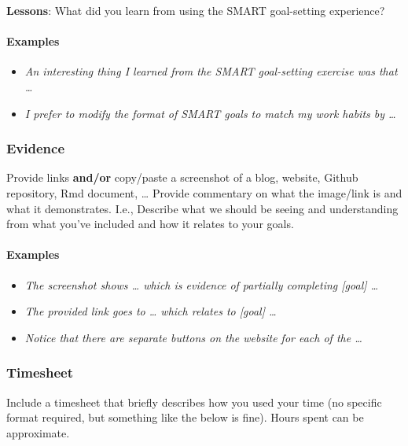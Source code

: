 \documentclass[
  openany]{book}
\providecommand{\tightlist}{%
  \setlength{\itemsep}{0pt}\setlength{\parskip}{0pt}}
\begin{document}
\textbf{Lessons}: What did you learn from using the SMART goal-setting experience?

\hypertarget{examples-3}{%
\paragraph{Examples}\label{examples-3}}

\begin{itemize}
\tightlist
\item
  \emph{An interesting thing I learned from the SMART goal-setting exercise was that \ldots{}}\\
\item
  \emph{I prefer to modify the format of SMART goals to match my work habits by \ldots{}}
\end{itemize}

\hypertarget{evidence}{%
\subsubsection{Evidence}\label{evidence}}

Provide links \textbf{and/or} copy/paste a screenshot of a blog, website, Github repository, Rmd document, \ldots{} Provide commentary on what the image/link is and what it demonstrates. I.e., Describe what we should be seeing and understanding from what you've included and how it relates to your goals.

\hypertarget{examples-4}{%
\paragraph{Examples}\label{examples-4}}

\begin{itemize}
\item
  \emph{The screenshot shows \ldots{} which is evidence of partially completing {[}goal{]} \ldots{}}
\item
  \emph{The provided link goes to \ldots{} which relates to {[}goal{]} \ldots{}}
\item
  \emph{Notice that there are separate buttons on the website for each of the \ldots{}}
\end{itemize}

\hypertarget{timesheet}{%
\subsubsection{Timesheet}\label{timesheet}}

Include a timesheet that briefly describes how you used your time (no specific format required, but something like the below is fine). Hours spent can be approximate.
\end{document}
